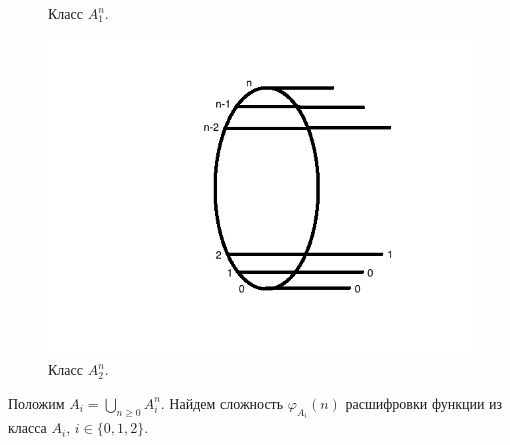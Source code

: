 \documentclass[oneside, final, 14pt]{extreport}
\begin{document}
\begin{figure}[h]
\begin{center}
\begin{minipage}[h]{0.3\linewidth}
 			\caption{Класс $A_1^n$.}
 			\label{ris:A1}
 		\end{minipage}
 		\hfill 
 		\begin{minipage}[h]{0.3\linewidth}
 		\includegraphics[width=1\linewidth]{A2}
 		\caption{Класс $A_2^n$.}
 		\label{ris:A2}
 	\end{minipage}
 	\end{center}
 \end{figure}

	Положим $A_i = \bigcup\limits_{n \geq 0}A_i^n$. Найдем сложность $\varphi_{A_i}(n)$ расшифровки функции из класса $A_i$, $i \in \{0,1,2\}$. 
\end{document}
